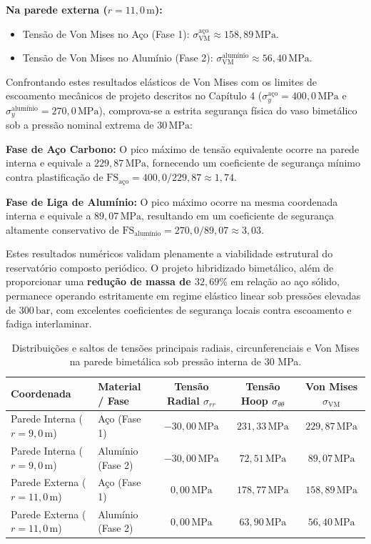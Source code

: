 \textbf{Na parede externa ($r = 11,0 \, \text{m}$):}
\begin{itemize}
  \item Tensão de Von Mises no Aço (Fase 1): $\sigma_{\text{VM}}^{\text{aço}} \approx 158,89 \, \text{MPa}$.
  \item Tensão de Von Mises no Alumínio (Fase 2): $\sigma_{\text{VM}}^{\text{alumínio}} \approx 56,40 \, \text{MPa}$.
\end{itemize}

Confrontando estes resultados elásticos de Von Mises com os limites de escoamento mecânicos de projeto descritos no Capítulo 4 ($\sigma_y^{\text{aço}} = 400,0 \, \text{MPa}$ e $\sigma_y^{\text{alumínio}} = 270,0 \, \text{MPa}$), comprova-se a estrita segurança física do vaso bimetálico sob a pressão nominal extrema de $30 \, \text{MPa}$:

\textbf{Fase de Aço Carbono:} O pico máximo de tensão equivalente ocorre na parede interna e equivale a $229,87 \, \text{MPa}$, fornecendo um coeficiente de segurança mínimo contra plastificação de $\text{FS}_{\text{aço}} = 400,0 / 229,87 \approx 1,74$.

\textbf{Fase de Liga de Alumínio:} O pico máximo ocorre na mesma coordenada interna e equivale a $89,07 \, \text{MPa}$, resultando em um coeficiente de segurança altamente conservativo de $\text{FS}_{\text{alumínio}} = 270,0 / 89,07 \approx 3,03$.

Estes resultados numéricos validam plenamente a viabilidade estrutural do reservatório composto periódico. O projeto hibridizado bimetálico, além de proporcionar uma \textbf{redução de massa de $32,69\%$} em relação ao aço sólido, permanece operando estritamente em regime elástico linear sob pressões elevadas de $300 \, \text{bar}$, com excelentes coeficientes de segurança locais contra escoamento e fadiga interlaminar.

\begin{table}[htbp]
  \centering
  \caption{Distribuições e saltos de tensões principais radiais, circunferenciais e Von Mises na parede bimetálica sob pressão interna de 30 MPa.}
  \label{tab:tensoes_r_int_r_ext}
  \begin{tabular}{|l|l|c|c|c|}
    \hline
    \textbf{Coordenada} & \textbf{Material / Fase} & \textbf{Tensão Radial $\sigma_{rr}$} & \textbf{Tensão Hoop $\sigma_{\theta\theta}$} & \textbf{Von Mises $\sigma_{\text{VM}}$} \\ \hline
    Parede Interna ($r=9,0 \, \text{m}$) & Aço (Fase 1) & $-30,00 \, \text{MPa}$ & $231,33 \, \text{MPa}$ & $229,87 \, \text{MPa}$ \\ \hline
    Parede Interna ($r=9,0 \, \text{m}$) & Alumínio (Fase 2) & $-30,00 \, \text{MPa}$ & $72,51 \, \text{MPa}$ & $89,07 \, \text{MPa}$ \\ \hline
    Parede Externa ($r=11,0 \, \text{m}$) & Aço (Fase 1) & $0,00 \, \text{MPa}$ & $178,77 \, \text{MPa}$ & $158,89 \, \text{MPa}$ \\ \hline
    Parede Externa ($r=11,0 \, \text{m}$) & Alumínio (Fase 2) & $0,00 \, \text{MPa}$ & $63,90 \, \text{MPa}$ & $56,40 \, \text{MPa}$ \\ \hline
  \end{tabular}
\end{table}

